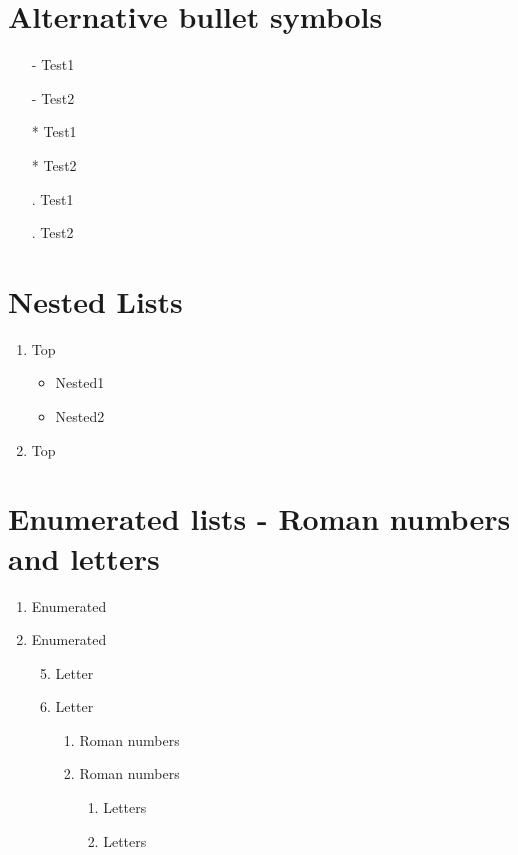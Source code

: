 \documentclass{report}
\begin{document}
    \section{Alternative bullet symbols}
    \begin{itemize}
        \item[-] Test1
        \item[-] Test2
    \end{itemize}
    \begin{itemize}
        \item[*] Test1
        \item[*] Test2
    \end{itemize}
    \begin{itemize}
        \item[.] Test1
        \item[.] Test2
    \end{itemize}
    \section{Nested Lists}
    \begin{enumerate}
        \item Top
        \begin{itemize}
            \item Nested1
            \item Nested2
        \end{itemize}
        \item Top
    \end{enumerate}
    \section{Enumerated lists - Roman numbers and letters}
    \begin{enumerate}
    \item Enumerated
    \item Enumerated
    \begin{enumerate}
        \setcounter{enumii}{4}
        \item Letter
        \item Letter
            \begin{enumerate}
                \item Roman numbers
                \item Roman numbers
            \begin{enumerate}
                \item Letters
                \item Letters
            \end{enumerate}
        \end{enumerate}
        \end{enumerate}
    \end{enumerate}
    
\end{document}
